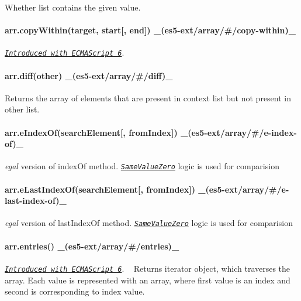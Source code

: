 Whether list contains the given value.

\paragraph*{arr.\+copy\+Within(target, start\mbox{[}, end\mbox{]}) \+\_\+(es5-\/ext/array/\#/copy-\/within)\+\_\+}

\href{http://people.mozilla.org/~jorendorff/es6-draft.html#sec-array.copywithin}{\tt {\itshape Introduced with E\+C\+M\+A\+Script 6}}. ~\newline
 \paragraph*{arr.\+diff(other) \+\_\+(es5-\/ext/array/\#/diff)\+\_\+}

Returns the array of elements that are present in context list but not present in other list.

\paragraph*{arr.\+e\+Index\+Of(search\+Element\mbox{[}, from\+Index\mbox{]}) \+\_\+(es5-\/ext/array/\#/e-\/index-\/of)\+\_\+}

{\itshape egal} version of {\ttfamily index\+Of} method. \href{http://people.mozilla.org/~jorendorff/es6-draft.html#sec-samevaluezero}{\tt {\itshape Same\+Value\+Zero}} logic is used for comparision

\paragraph*{arr.\+e\+Last\+Index\+Of(search\+Element\mbox{[}, from\+Index\mbox{]}) \+\_\+(es5-\/ext/array/\#/e-\/last-\/index-\/of)\+\_\+}

{\itshape egal} version of {\ttfamily last\+Index\+Of} method. \href{http://people.mozilla.org/~jorendorff/es6-draft.html#sec-samevaluezero}{\tt {\itshape Same\+Value\+Zero}} logic is used for comparision

\paragraph*{arr.\+entries() \+\_\+(es5-\/ext/array/\#/entries)\+\_\+}

\href{http://people.mozilla.org/~jorendorff/es6-draft.html#sec-array.prototype.entries}{\tt {\itshape Introduced with E\+C\+M\+A\+Script 6}}. ~\newline
Returns iterator object, which traverses the array. Each value is represented with an array, where first value is an index and second is corresponding to index value.

